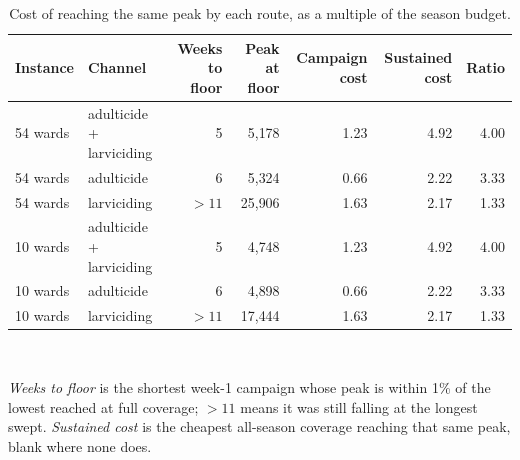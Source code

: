 \begin{table}[htbp]
\centering\small
\caption{Cost of reaching the same peak by each route, as a multiple of the season budget.}
\label{tab:threshold_summary}
\begin{tabular}{@{}llrrrrr@{}}
\toprule
Instance & Channel & Weeks to floor & Peak at floor & Campaign cost & Sustained cost & Ratio \\
\midrule
54 wards & adulticide + larviciding & 5 & 5{,}178 & 1.23 & 4.92 & 4.00 \\
54 wards & adulticide & 6 & 5{,}324 & 0.66 & 2.22 & 3.33 \\
54 wards & larviciding & $>11$ & 25{,}906 & 1.63 & 2.17 & 1.33 \\
10 wards & adulticide + larviciding & 5 & 4{,}748 & 1.23 & 4.92 & 4.00 \\
10 wards & adulticide & 6 & 4{,}898 & 0.66 & 2.22 & 3.33 \\
10 wards & larviciding & $>11$ & 17{,}444 & 1.63 & 2.17 & 1.33 \\
\bottomrule
\end{tabular}
\\[2pt]\parbox{0.92\textwidth}{\footnotesize \emph{Weeks to floor} is the shortest week-1 campaign whose peak is within 1\% of the lowest reached at full coverage; $>11$ means it was still falling at the longest swept. \emph{Sustained cost} is the cheapest all-season coverage reaching that same peak, blank where none does.}
\end{table}

